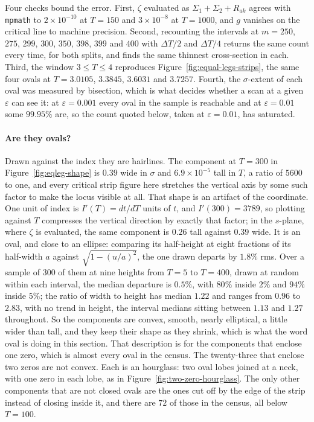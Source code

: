 \documentclass[11pt]{article}
\theoremstyle{definition}
\begin{document}
Four checks bound the error. First, $\zeta$ evaluated as $\Sigma_1+\Sigma_2+R_{ak}$
agrees with \texttt{mpmath} to $2\times10^{-10}$ at $T=150$ and
$3\times10^{-8}$ at $T=1000$, and $g$ vanishes on the critical line to machine
precision. Second, recounting the intervals at $m=250$, $275$, $299$, $300$, $350$, $398$,
$399$ and $400$ with $\Delta T/2$ and $\Delta T/4$ returns the same count every
time, for both splits, and finds the same thinnest cross-section in each. Third, the window $3\le T\le4$ reproduces
Figure~\ref{fig:equal-legs-strips}, the same four ovals at $T=3.0105$,
$3.3845$, $3.6031$ and $3.7257$. Fourth, the $\sigma$-extent of each oval was
measured by bisection, which is what decides whether a scan at a given
$\varepsilon$ can see it: at $\varepsilon=0.001$ every oval in the sample is
reachable and at $\varepsilon=0.01$ some $99.95\%$ are, so the count quoted
below, taken at $\varepsilon=0.01$, has saturated.

\paragraph{Are they ovals?} Drawn against the index they are hairlines. The
component at $T=300$ in Figure~\ref{fig:eqleg-shape} is $0.39$ wide in $\sigma$
and $6.9\times10^{-5}$ tall in $T$, a ratio of $5600$ to one, and every critical strip
figure here stretches the vertical axis by some such factor to make the locus
visible at all. That shape is an artifact of the coordinate. One unit of index
is $I'(T)=dt/dT$ units of $t$, and $I'(300)=3789$, so plotting against $T$
compresses the vertical direction by exactly that factor; in the $s$-plane,
where $\zeta$ is evaluated, the same component is $0.26$ tall against $0.39$
wide. It is an oval, and close to an ellipse: comparing its half-height at
eight fractions of its half-width $a$ against $\sqrt{1-(u/a)^2}$, the one drawn
departs by $1.8\%$ rms. Over a sample of $300$ of them at nine heights from
$T=5$ to $T=400$, drawn at random within each interval, the median departure is
$0.5\%$, with $80\%$ inside $2\%$ and $94\%$ inside $5\%$; the ratio of width to
height has median $1.22$ and ranges from $0.96$ to $2.83$, with no trend in
height, the interval medians sitting between $1.13$ and $1.27$ throughout. So
the components are convex, smooth, nearly elliptical, a little wider than tall,
and they keep their shape as they shrink, which is what the word oval is
doing in this section. That description is for the components that enclose one
zero, which is almost every oval in the census. The twenty-three that enclose
two zeros are not convex. Each is an hourglass: two oval lobes joined at a
neck, with one zero in each lobe, as in
Figure~\ref{fig:two-zero-hourglass}. The only other components that are not
closed ovals are the ones cut off by the edge of the strip instead of closing
inside it, and there are $72$ of those in the census, all below $T=100$.
\end{document}
